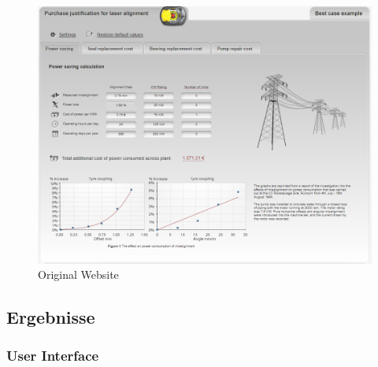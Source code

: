 \documentclass{article}
\begin{document}
	
	\begin{figure}[h]
		\includegraphics[scale=0.5]{Bilder/15.png}
		\centering
		\vspace{0 cm}
		\caption{Original Website}
		\label{fig21}	
	\end{figure}

	\newpage
	\subsection{Ergebnisse}
	
	
		\subsubsection{User Interface}
		
\end{document}
